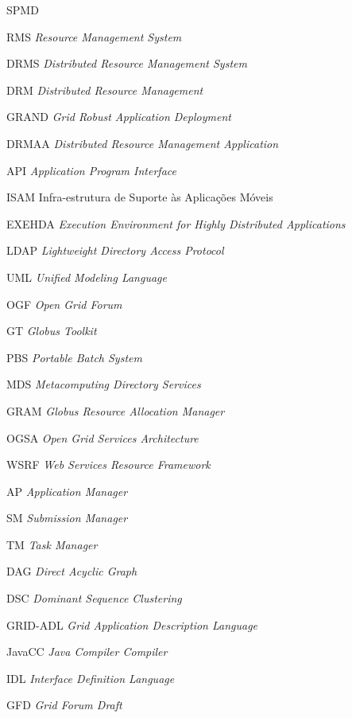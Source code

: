 
\tableofcontents


\begin{listofabbrv}{SPMD}
        \item[RMS]   \emph{Resource Management System}
        \item[DRMS]  \emph{Distributed Resource Management System}
        \item[DRM]   \emph{Distributed Resource Management}
        \item[GRAND] \emph{Grid Robust Application Deployment}
        \item[DRMAA] \emph{Distributed Resource Management Application}
        \item[API]   \emph{Application Program Interface}
        \item[ISAM]  Infra-estrutura de Suporte às Aplicações Móveis
        \item[EXEHDA]\emph{Execution Environment for Highly Distributed Applications}
        \item[LDAP]  \emph{Lightweight Directory Access Protocol}
        \item[UML]   \emph{Unified Modeling Language}
        \item[OGF]   \emph{Open Grid Forum}
        \item[GT]    \emph{Globus Toolkit}
        \item[PBS]   \emph{Portable Batch System}
        \item[MDS]   \emph{Metacomputing Directory Services}
        \item[GRAM]  \emph{Globus Resource Allocation Manager}
        \item[OGSA]  \emph{Open Grid Services Architecture}
        \item[WSRF]  \emph{Web Services Resource Framework}
        \item[AP]    \emph{Application Manager}
        \item[SM]    \emph{Submission Manager}
        \item[TM]    \emph{Task Manager}
        \item[DAG]	\emph{Direct Acyclic Graph}
        \item[DSC]	\emph{Dominant Sequence Clustering}
        \item[GRID-ADL] \emph{Grid Application Description Language}
        \item[JavaCC]\emph{Java Compiler Compiler}
        \item[IDL]	\emph{Interface Definition Language}
        \item[GFD]   \emph{Grid Forum Draft}
\end{listofabbrv}


\listoffigures

\listoftables

